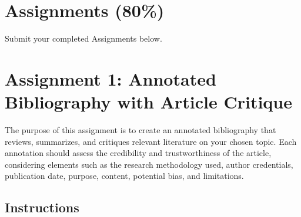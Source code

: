 \documentclass[
  letterpaper,
  DIV=11,
  numbers=noendperiod]{scrreprt}
\begin{document}

\chapter{Assignments (80\%)}\label{assignments-80}

Submit your completed Assignments below.


\chapter{Assignment 1: Annotated Bibliography with Article
Critique}\label{assignment-1-annotated-bibliography-with-article-critique}

The purpose of this assignment is to create an annotated bibliography
that reviews, summarizes, and critiques relevant literature on your
chosen topic. Each annotation should assess the credibility and
trustworthiness of the article, considering elements such as the
research methodology used, author credentials, publication date,
purpose, content, potential bias, and limitations.

\section{Instructions}\label{instructions-4}
\end{document}
